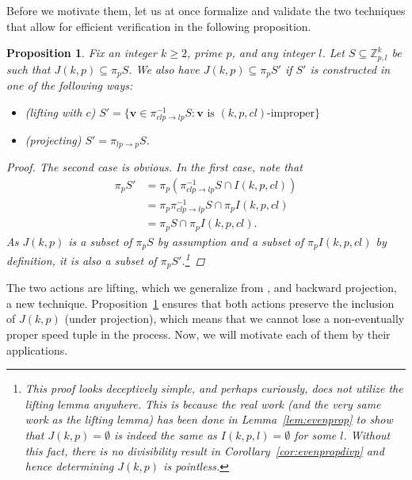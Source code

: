\documentclass[11pt]{amsart}
\newcommand{\Z}{\mathbb{Z}}
\newcommand{\vbf}{\mathbf{v}}
\newtheorem{proposition}[theorem]{Proposition}
\theoremstyle{definition}
\theoremstyle{remark}
\begin{document}
Before we motivate them, let us at once formalize and validate the two techniques that allow for efficient verification in the following proposition.
\begin{proposition}
\label{prop:liftproj} 
    Fix an integer $k \ge 2$, prime $p$, and any integer $l$.
    Let $S\subseteq\Z_{p,l}^k$ be such that $J(k,p)\subseteq\pi_{p}S$. 
    We also have $J(k,p)\subseteq\pi_pS'$ if $S'$ is constructed in one of the following ways:
    \begin{itemize}
        \item (lifting with $c$) $S'=\{\vbf\in\pi_{clp\rightarrow lp}^{-1}S:\vbf\text{ is $(k,p,cl)$-improper}\}$
        \item (projecting) $S'=\pi_{lp\to p}S$.
    \end{itemize}
    \begin{proof}
        The second case is obvious. In the first case, note that
        \[\begin{split}
            \pi_pS'&=\pi_p \left( \pi_{clp\rightarrow lp}^{-1}S\cap I(k,p,cl) \right) \\
                   &=\pi_p\pi_{clp\rightarrow lp}^{-1}S\cap\pi_pI(k,p,cl) \\
                   &=\pi_pS\cap\pi_pI(k,p,cl).
        \end{split} \] 
        As $J(k,p)$ is a subset of $\pi_pS$ by assumption and a subset of $\pi_pI(k,p,cl)$ by definition, 
        it is also a subset of $\pi_pS'$.\footnote{This proof looks deceptively simple, and perhaps curiously, 
          does not utilize the lifting lemma  \cite[Lemma 7]{Trakulthongchai} anywhere. 
          This is because the real work (and the very same work as the lifting lemma) has been done 
          in Lemma~\ref{lem:evenprop} to show that 
          $J(k,p)=\emptyset$ is indeed the same as $I(k,p,l)=\emptyset$ for some $l$. 
          Without this fact, there is no divisibility result in Corollary~\ref{cor:evenpropdivp} 
          and hence determining $J(k,p)$ is pointless.
        }
    \end{proof}
\end{proposition}

The two actions are lifting, which we generalize from \cite{Trakulthongchai}, and backward projection, a new technique.
Proposition~\ref{prop:liftproj} ensures that both actions preserve the inclusion of $J(k,p)$ (under projection), 
which means that we cannot lose a non-eventually proper speed tuple in the process. 
Now, we will motivate each of them by their applications.
\end{document}
